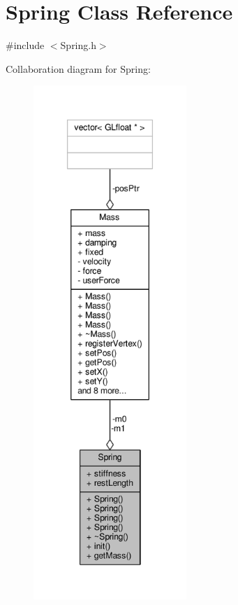 \hypertarget{classSpring}{}\section{Spring Class Reference}
\label{classSpring}


{\ttfamily \#include $<$Spring.\+h$>$}



Collaboration diagram for Spring\+:\nopagebreak
\begin{figure}[H]
\begin{center}
\leavevmode
\includegraphics[height=550pt]{classSpring__coll__graph}
\end{center}
\end{figure}
